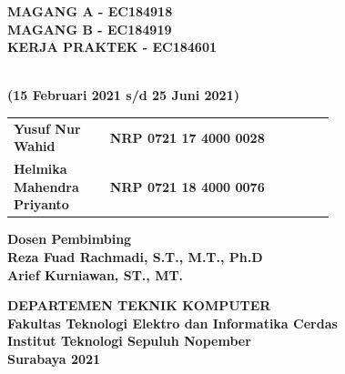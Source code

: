 \begin{flushleft}

  \sffamily\color{white}

  \noindent\textbf{MAGANG A - EC184918} \\
  \noindent\textbf{MAGANG B - EC184919} \\
  \noindent\textbf{KERJA PRAKTEK - EC184601}
  \vspace{4ex}

   \\
  \textbf{(15 Februari 2021 s/d 25 Juni 2021)}
  \vspace{6ex}

  \vspace{4ex}

  \begin{adjustwidth}{-2mm}{}
    \begin{tabular}{lcp{0.7\linewidth}}
      \textbf{Yusuf Nur Wahid} & & \textbf{NRP 0721 17 4000 0028} \\
      \textbf{Helmika Mahendra Priyanto} & & \textbf{NRP 0721 18 4000 0076} \\
    \end{tabular}
  \end{adjustwidth}
  \vspace{4ex}

  \noindent\textbf{Dosen Pembimbing} \\
  \textbf{Reza Fuad Rachmadi, S.T., M.T., Ph.D} \\
  \textbf{Arief Kurniawan, ST., MT.}
  \vspace{6ex}

  \noindent\textbf{DEPARTEMEN TEKNIK KOMPUTER} \\
  \textbf{Fakultas Teknologi Elektro dan Informatika Cerdas} \\
  \textbf{Institut Teknologi Sepuluh Nopember} \\
  \textbf{Surabaya 2021}

\end{flushleft}

\restoregeometry